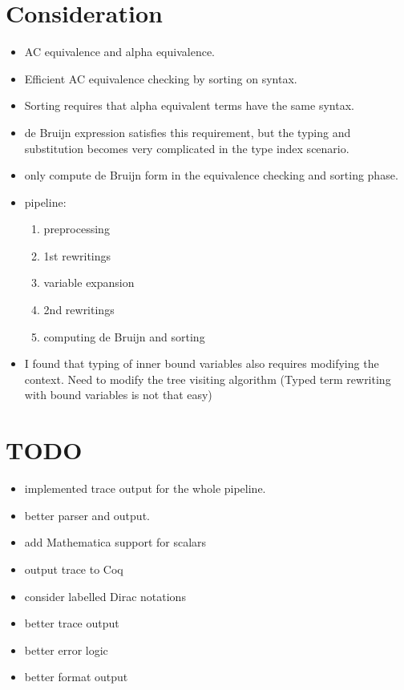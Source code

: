 \documentclass{article}
\begin{document}
\section{Consideration}
\begin{itemize}
    \item AC equivalence and alpha equivalence.
    \item Efficient AC equivalence checking by sorting on syntax.
    \item Sorting requires that alpha equivalent terms have the same syntax.
    \item de Bruijn expression satisfies this requirement, but the typing and substitution becomes very complicated in the type index scenario.
    \item only compute de Bruijn form in the equivalence checking and sorting phase.
    \item pipeline: 
        \begin{enumerate}
            \item preprocessing
            \item 1st rewritings
            \item variable expansion
            \item 2nd rewritings 
            \item computing de Bruijn and sorting
        \end{enumerate}

    \item I found that typing of inner bound variables also requires modifying the context.
    Need to modify the tree visiting algorithm
    (Typed term rewriting with bound variables is not that easy)    
\end{itemize}

\section{TODO}
\begin{itemize}
    \item implemented trace output for the whole pipeline.
    \item better parser and output.
    \item add Mathematica support for scalars
    \item output trace to Coq
    \item consider labelled Dirac notations
    \item better trace output
    \item better error logic
    \item better format output
\end{itemize}
\end{document}
